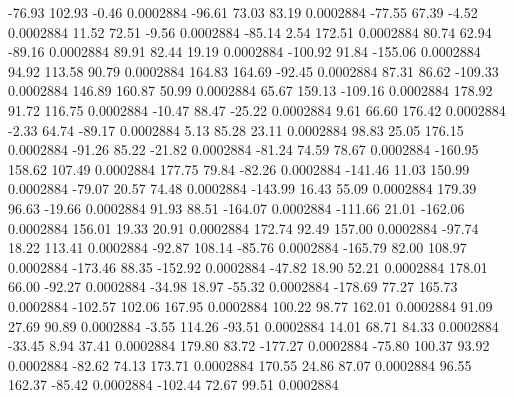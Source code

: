       -76.93      102.93       -0.46     0.0002884
      -96.61       73.03       83.19     0.0002884
      -77.55       67.39       -4.52     0.0002884
       11.52       72.51       -9.56     0.0002884
      -85.14        2.54      172.51     0.0002884
       80.74       62.94      -89.16     0.0002884
       89.91       82.44       19.19     0.0002884
     -100.92       91.84     -155.06     0.0002884
       94.92      113.58       90.79     0.0002884
      164.83      164.69      -92.45     0.0002884
       87.31       86.62     -109.33     0.0002884
      146.89      160.87       50.99     0.0002884
       65.67      159.13     -109.16     0.0002884
      178.92       91.72      116.75     0.0002884
      -10.47       88.47      -25.22     0.0002884
        9.61       66.60      176.42     0.0002884
       -2.33       64.74      -89.17     0.0002884
        5.13       85.28       23.11     0.0002884
       98.83       25.05      176.15     0.0002884
      -91.26       85.22      -21.82     0.0002884
      -81.24       74.59       78.67     0.0002884
     -160.95      158.62      107.49     0.0002884
      177.75       79.84      -82.26     0.0002884
     -141.46       11.03      150.99     0.0002884
      -79.07       20.57       74.48     0.0002884
     -143.99       16.43       55.09     0.0002884
      179.39       96.63      -19.66     0.0002884
       91.93       88.51     -164.07     0.0002884
     -111.66       21.01     -162.06     0.0002884
      156.01       19.33       20.91     0.0002884
      172.74       92.49      157.00     0.0002884
      -97.74       18.22      113.41     0.0002884
      -92.87      108.14      -85.76     0.0002884
     -165.79       82.00      108.97     0.0002884
     -173.46       88.35     -152.92     0.0002884
      -47.82       18.90       52.21     0.0002884
      178.01       66.00      -92.27     0.0002884
      -34.98       18.97      -55.32     0.0002884
     -178.69       77.27      165.73     0.0002884
     -102.57      102.06      167.95     0.0002884
      100.22       98.77      162.01     0.0002884
       91.09       27.69       90.89     0.0002884
       -3.55      114.26      -93.51     0.0002884
       14.01       68.71       84.33     0.0002884
      -33.45        8.94       37.41     0.0002884
      179.80       83.72     -177.27     0.0002884
      -75.80      100.37       93.92     0.0002884
      -82.62       74.13      173.71     0.0002884
      170.55       24.86       87.07     0.0002884
       96.55      162.37      -85.42     0.0002884
     -102.44       72.67       99.51     0.0002884
